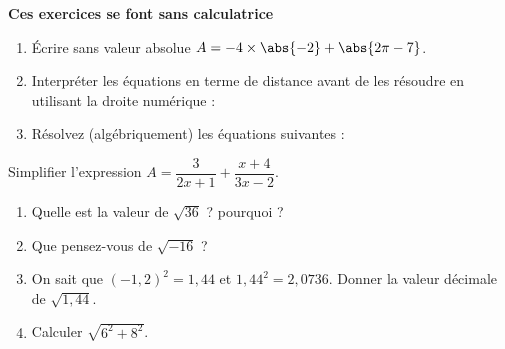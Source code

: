 %
\begin{center}
\bfseries \Large 
Ces exercices se font sans calculatrice
\end{center}
%
%
\begin{mth}
    \begin{enumerate}[label=\bfseries\arabic*.]
    \item \'Ecrire sans valeur absolue $A=-4\times\abs{-2}+\abs{2\pi-7}$.
    \item Interpréter les équations en terme de distance avant de les résoudre en utilisant la droite numérique :
    \item Résolvez (algébriquement) les équations suivantes :
\end{enumerate}
\end{mth}
%
%
\begin{mth} Simplifier l'expression $A=\dfrac{3}{2x+1}+\dfrac{x+4}{3x-2}$.
\end{mth}
%
%
\begin{mth}
\begin{enumerate}[label=\bfseries\arabic*.]
\item Quelle est la valeur de $\sqrt{36}$ ? pourquoi ?
\item Que pensez-vous de $\sqrt{-16}$ ?
\item On sait que $(-1,2)^2=1,44$ et $1,44^2=2,0736$. Donner la valeur décimale de $\sqrt{1,44}$.
\item Calculer $\sqrt{6^2+8^2}$.
\end{enumerate}
\end{mth}
